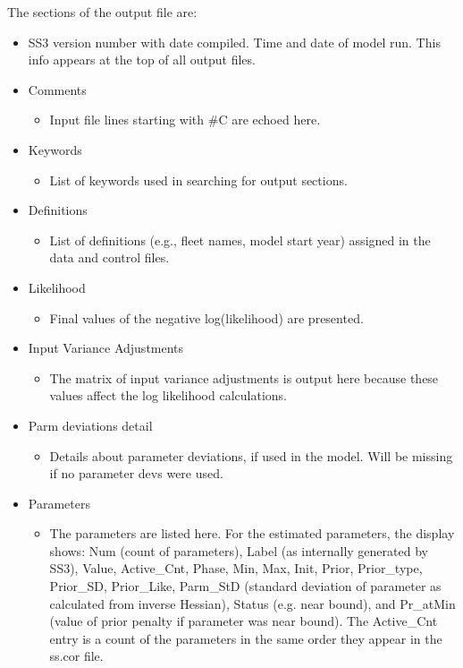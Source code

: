 The sections of the output file are:
\begin{itemize}
	\item SS3 version number with date compiled.  Time and date of model run.  This info appears at the top of all output files.
	\item Comments
		\begin{itemize}
			\item 	Input file lines starting with \#C are echoed here.
		\end{itemize}
	\item Keywords
		\begin{itemize}
			\item List of keywords used in searching for output sections.
		\end{itemize}
	\item Definitions
		\begin{itemize}
			\item List of definitions (e.g., fleet names, model start year) assigned in the data and control files.
		\end{itemize}
	\item Likelihood
		\begin{itemize}
			\item Final values of the negative log(likelihood) are presented.
		\end{itemize}
	\item Input Variance Adjustments
		\begin{itemize}
			\item The matrix of input variance adjustments is output here because these values affect the log likelihood calculations.
		\end{itemize}
	\item{Parm deviations detail}
	    \begin{itemize}
		    \item Details about parameter deviations, if used in the model. Will be missing if no parameter devs were used.
		\end{itemize}
	\item Parameters
		\begin{itemize}
			\item The parameters are listed here.  For the estimated parameters, the display shows: Num (count of parameters), Label (as internally generated by SS3), Value, Active\_Cnt, Phase, Min, Max, Init, Prior, Prior\_type, Prior\_SD, Prior\_Like, Parm\_StD (standard deviation of parameter as calculated from inverse Hessian), Status (e.g. near bound), and Pr\_atMin (value of prior penalty if parameter was near bound).  The Active\_Cnt entry is a count of the parameters in the same order they appear in the ss.cor file.

\end{itemize}
\end{itemize}
